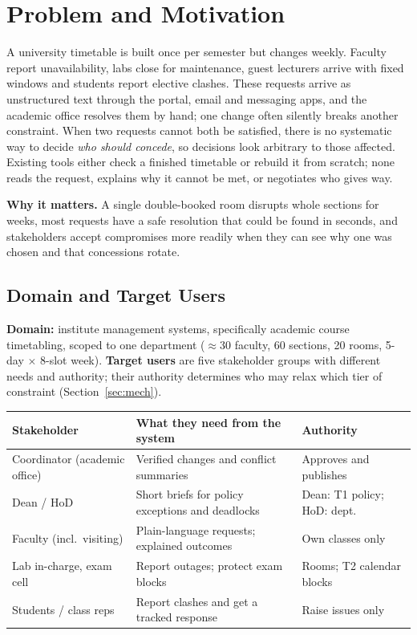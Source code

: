 \documentclass[11pt,a4paper]{article}
\begin{document}
\section{Problem and Motivation}
A university timetable is built once per semester but changes weekly.
Faculty report unavailability, labs close for maintenance, guest lecturers
arrive with fixed windows and students report elective clashes. These
requests arrive as unstructured text through the portal, email and messaging
apps, and the academic office resolves them by hand; one change often
silently breaks another constraint. When two requests cannot both be
satisfied, there is no systematic way to decide \emph{who should concede},
so decisions look arbitrary to those affected. Existing tools either
check a finished timetable or rebuild it from scratch; none reads the
request, explains why it cannot be met, or negotiates who gives way.

\noindent\textbf{Why it matters.} A single double-booked room disrupts whole
sections for weeks, most requests have a safe resolution that could be
found in seconds, and stakeholders accept compromises more readily when they
can see why one was chosen and that concessions rotate.

\subsection{Domain and Target Users}
\textbf{Domain:} institute management systems, specifically academic course
timetabling, scoped to one department ($\approx$30 faculty, 60 sections, 20
rooms, 5-day $\times$ 8-slot week). \textbf{Target users} are five
stakeholder groups with different needs and authority; their authority
determines who may relax which tier of constraint (Section~\ref{sec:mech}).
\begin{table}[H]
\centering\small
\begin{tabularx}{\textwidth}{@{}l Y l@{}}
\toprule
\textbf{Stakeholder} & \textbf{What they need from the system} & \textbf{Authority}\\
\midrule
Coordinator (academic office) & Verified changes and conflict summaries & Approves and publishes\\
Dean / HoD & Short briefs for policy exceptions and deadlocks & Dean: T1 policy; HoD: dept.\\
Faculty (incl.\ visiting) & Plain-language requests; explained outcomes & Own classes only\\
Lab in-charge, exam cell & Report outages; protect exam blocks & Rooms; T2 calendar blocks\\
Students / class reps & Report clashes and get a tracked response & Raise issues only\\
\bottomrule
\end{tabularx}
\end{table}
\end{document}
